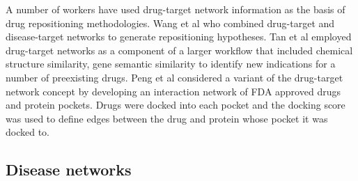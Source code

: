 \documentclass[]{book}
\begin{document}
A number of workers have used drug-target network information as the
basis of drug repositioning methodologies. Wang et al
\cite{Wang:2014lp} who combined drug-target and disease-target
networks to generate repositioning hypotheses. Tan et al
\cite{Tan:2014qb} employed drug-target networks as a component of a
larger workflow that included chemical structure similarity, gene
semantic similarity to identify new indications for a number of
preexisting drugs.  Peng et al \cite{Peng:2014vy} considered a variant
of the drug-target network concept by developing an interaction
network of FDA approved drugs and protein pockets. Drugs were docked
into each pocket and the docking score was used to define edges
between the drug and protein whose pocket it was docked to.


\subsection{Disease networks}
\label{sec:disease-networks}
\end{document}
